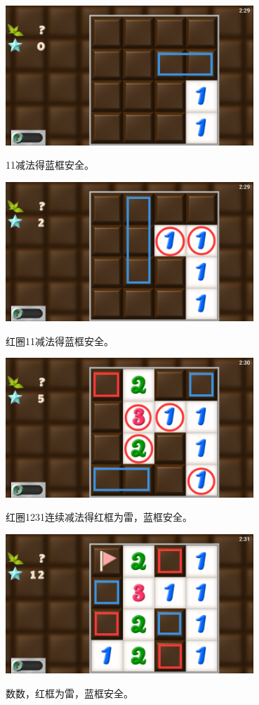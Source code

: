 \subsection{} %
\begin{center}
    \includegraphics[width=0.7\textwidth]{puzzle/148-1.png}
\end{center}
11减法得蓝框安全。
\begin{center}
    \includegraphics[width=0.7\textwidth]{puzzle/148-2.png}
\end{center}
红圈11减法得蓝框安全。
\begin{center}
    \includegraphics[width=0.7\textwidth]{puzzle/148-3.png}
\end{center}
红圈1231连续减法得红框为雷，蓝框安全。
\begin{center}
    \includegraphics[width=0.7\textwidth]{puzzle/148-4.png}
\end{center}
数数，红框为雷，蓝框安全。

